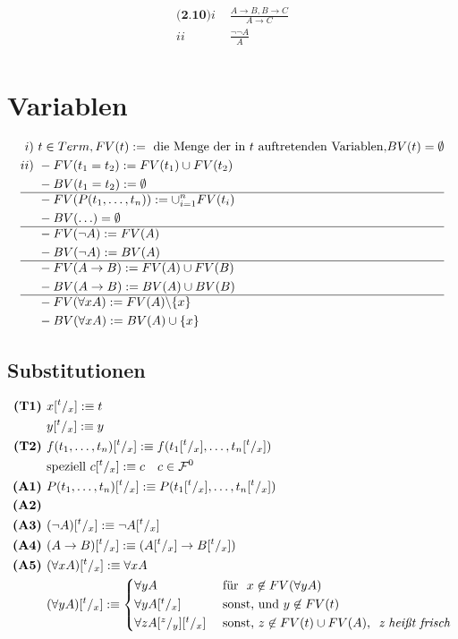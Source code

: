\documentclass{article}
\begin{document}
		\begin{align*}
			\textbf{(2.10)}\textit{i } & \frac{A \rightarrow B, B \rightarrow C}{A \rightarrow C}\\
			\textit{ii } & \frac{\neg\neg A}{A}\\
		\end{align*}
	\section*{Variablen} 
		\begin{align*}
			i) &\ t \in Term, FV(t) := \text{ die Menge der in } t \text{ auftretenden Variablen,} BV(t) = \emptyset\\
			ii) &\ - FV(t_1 = t_2) := FV(t_1) \cup FV(t_2)\\
			&\ - BV(t_1 = t_2) := \emptyset\\\hline
			&\ - FV(P(t_1, \ldots, t_n)) := \cup^{n}_{i=1} FV(t_i)\\
			&\ - BV(\ldots) = \emptyset\\\hline
			&\ - FV(\neg A) := FV(A)\\
			&\ - BV(\neg A) := BV(A)\\\hline
			&\ - FV(A \rightarrow B) := FV(A) \cup FV(B)\\
			&\ - BV(A \rightarrow B) := BV(A) \cup BV(B)\\\hline
			&\ - FV(\forall x A) := FV(A) \backslash\{x\}\\
			&\ - BV(\forall x A) := BV(A) \cup \{x\}\\
		\end{align*}
		\subsection*{Substitutionen}
			\begin{align*}
				\textbf{(T1) } & x[^t/_x] :\equiv t\\
				& y[^t/_x] :\equiv y\\
				\textbf{(T2) } & f(t_1, \ldots, t_n) [^t/_x] :\equiv f(t_1[^t/_x], \ldots, t_n[^t/_x])\\
				& \text{speziell } c[^t/_x] :\equiv c \quad c \in \mathcal{F}^0\\
				\textbf{(A1) } & P(t_1, \ldots, t_n) [^t/_x] :\equiv P(t_1[^t/_x], \ldots, t_n[^t/_x])\\
				\textbf{(A2) } &\\
				\textbf{(A3) } & (\neg A) [^t/_x] :\equiv \neg A[^t/_x]\\
				\textbf{(A4) } & (A \rightarrow B) [^t/_x] :\equiv (A[^t/_x] \rightarrow B[^t/_x])\\
				\textbf{(A5) } & (\forall x A) [^t/_x] :\equiv \forall x A\\
				& (\forall y A) [^t/_x] :\equiv 
				\begin{cases*}
					\forall y A & \text{ f\"ur } $ x \not \in FV(\forall y A)$\\
					\forall y A[^t/_x] & \text{ sonst, und} $y \not \in FV(t)$\\
					\forall z A[^z/_y][^t/_x] & \text{ sonst,} $z \not \in FV(t) \cup FV(A)$,  \textit{ z hei\ss t frisch}\\
				\end{cases*}
			\end{align*}
\end{document}
